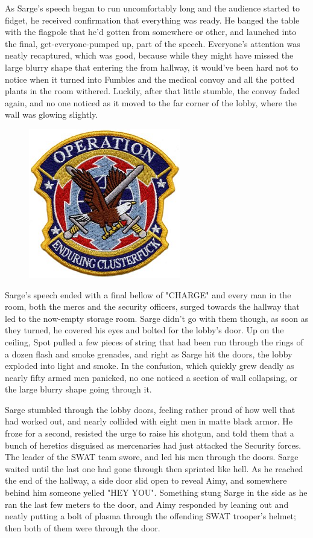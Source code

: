 As Sarge's speech began to run uncomfortably long and the audience started to fidget, he received confirmation that everything was ready. 
He banged the table with the flagpole that he'd gotten from somewhere or other, and launched into the final, get-everyone-pumped up, part of the speech. 
Everyone's attention was neatly recaptured, which was good, because while they might have missed the large blurry shape that entering the from hallway, it would've been hard not to notice when it turned into Fumbles and the medical convoy and all the potted plants in the room withered. 
Luckily, after that little stumble, the convoy faded again, and no one noticed as it moved to the far corner of the lobby, where the wall was glowing slightly.

\begin{figure}
	\begin{center}
		\includegraphics[width=\figwidth]{pics/14/46.png}
	\end{center}
\end{figure}
Sarge's speech ended with a final bellow of "CHARGE" and every man in the room, both the mercs and the security officers, surged towards the hallway that led to the now-empty storage room. 
Sarge didn't go with them though, as soon as they turned, he covered his eyes and bolted for the lobby's door. 
Up on the ceiling, Spot pulled a few pieces of string that had been run through the rings of a dozen flash and smoke grenades, and right as Sarge hit the doors, the lobby exploded into light and smoke. 
In the confusion, which quickly grew deadly as nearly fifty armed men panicked, no one noticed a section of wall collapsing, or the large blurry shape going through it.

Sarge stumbled through the lobby doors, feeling rather proud of how well that had worked out, and nearly collided with eight men in matte black armor. 
He froze for a second, resisted the urge to raise his shotgun, and told them that a bunch of heretics disguised as mercenaries had just attacked the Security forces. 
The leader of the SWAT team swore, and led his men through the doors. 
Sarge waited until the last one had gone through then sprinted like hell. 
As he reached the end of the hallway, a side door slid open to reveal Aimy, and somewhere behind him someone yelled "HEY YOU". 
Something stung Sarge in the side as he ran the last few meters to the door, and Aimy responded by leaning out and neatly putting a bolt of plasma through the offending SWAT trooper's helmet; 
then both of them were through the door.

